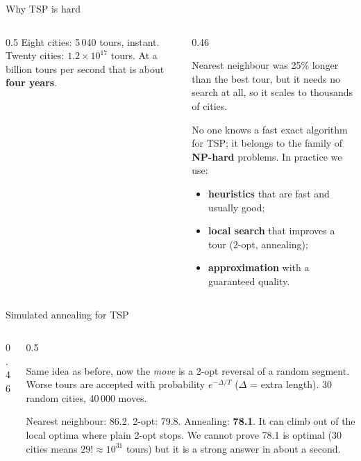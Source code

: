 \documentclass[aspectratio=169,10pt]{beamer}
\begin{document}
\begin{frame}{Why TSP is hard}
\begin{columns}[T]
\begin{column}{0.5\textwidth}
\vspace{2mm}
{\small
Eight cities: 5\,040 tours, instant. Twenty cities: $1.2\times10^{17}$ tours. At a billion tours per second that is about \textbf{four years}.}
\end{column}
\begin{column}{0.46\textwidth}
{\small
Nearest neighbour was 25\% longer than the best tour, but it needs no search at all, so it scales to thousands of cities.

\vspace{2mm}
No one knows a fast exact algorithm for TSP; it belongs to the family of \textbf{NP-hard} problems. In practice we use:
\begin{itemize}\setlength\itemsep{2pt}
\item \textbf{heuristics} that are fast and usually good;
\item \textbf{local search} that improves a tour (2-opt, annealing);
\item \textbf{approximation} with a guaranteed quality.\end{itemize}}
\end{column}
\end{columns}
\end{frame}

\begin{frame}[allowframebreaks]{Simulated annealing for TSP}
\framebreak
\begin{columns}[T]
\begin{column}{0.46\textwidth}
\end{column}
\begin{column}{0.5\textwidth}
{\small
Same idea as before, now the \emph{move} is a 2-opt reversal of a random segment. Worse tours are accepted with probability $e^{-\Delta/T}$ ($\Delta$ = extra length). 30 random cities, 40\,000 moves.

\vspace{2mm}
Nearest neighbour: 86.2. 2-opt: 79.8. Annealing: \textbf{78.1}. It can climb out of the local optima where plain 2-opt stops. We cannot prove 78.1 is optimal (30 cities means $29!\approx 10^{31}$ tours) but it is a strong answer in about a second.}
\end{column}
\end{columns}
\end{frame}
\end{document}
